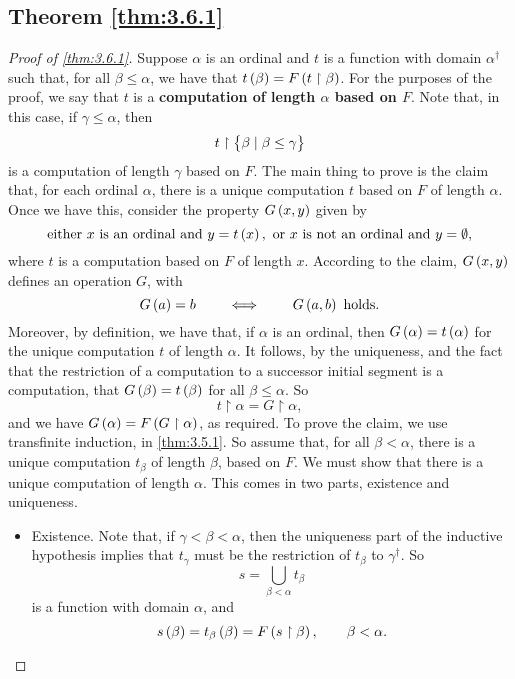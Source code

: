 \pagebreak

\subsection{Theorem \ref{thm:3.6.1}}

\begin{proof}[Proof of \ref{thm:3.6.1}]
Suppose $ \alpha $ is an ordinal and $ t $ is a function with domain $ \alpha^\dagger $ such that, for all $ \beta \le \alpha $, we have that $ t\br{\beta} = F\br{t \upharpoonright \beta} $. For the purposes of the proof, we say that $ t $ is a \textbf{computation of length $ \alpha $ based on $ F $}. Note that, in this case, if $ \gamma \le \alpha $, then
$$ t \upharpoonright \cbr{\beta \mid \beta \le \gamma} $$
is a computation of length $ \gamma $ based on $ F $. The main thing to prove is the claim that, for each ordinal $ \alpha $, there is a unique computation $ t $ based on $ F $ of length $ \alpha $. Once we have this, consider the property $ G\br{x, y} $ given by
$$ \text{either} \ x \ \text{is an ordinal and} \ y = t\br{x}, \ \text{or} \ x \ \text{is not an ordinal and} \ y = \emptyset, $$
where $ t $ is a computation based on $ F $ of length $ x $. According to the claim, $ G\br{x, y} $ defines an operation $ G $, with
$$ G\br{a} = b \qquad \iff \qquad G\br{a, b} \ \text{holds}. $$
Moreover, by definition, we have that, if $ \alpha $ is an ordinal, then $ G\br{\alpha} = t\br{\alpha} $ for the unique computation $ t $ of length $ \alpha $. It follows, by the uniqueness, and the fact that the restriction of a computation to a successor initial segment is a computation, that $ G\br{\beta} = t\br{\beta} $ for all $ \beta \le \alpha $. So
$$ t \upharpoonright \alpha = G \upharpoonright \alpha, $$
and we have $ G\br{\alpha} = F\br{G \upharpoonright \alpha} $, as required. To prove the claim, we use transfinite induction, in \ref{thm:3.5.1}. So assume that, for all $ \beta < \alpha $, there is a unique computation $ t_\beta $ of length $ \beta $, based on $ F $. We must show that there is a unique computation of length $ \alpha $. This comes in two parts, existence and uniqueness.
\begin{itemize}
\item Existence. Note that, if $ \gamma < \beta < \alpha $, then the uniqueness part of the inductive hypothesis implies that $ t_\gamma $ must be the restriction of $ t_\beta $ to $ \gamma^\dagger $. So
$$ s = \bigcup_{\beta < \alpha} t_\beta $$
is a function with domain $ \alpha $, and
$$ s\br{\beta} = t_\beta\br{\beta} = F\br{s \upharpoonright \beta}, \qquad \beta < \alpha. $$

\end{itemize}
\end{proof}
